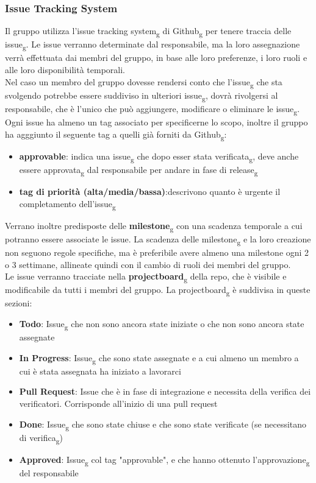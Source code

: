 \subsubsection{Issue Tracking System}
Il gruppo utilizza l'issue tracking system\textsubscript{g} di Github\textsubscript{g} per tenere traccia delle issue\textsubscript{g}. 
Le issue verranno determinate dal responsabile, ma la loro assegnazione verrà effettuata dai membri del gruppo, in base alle loro preferenze, i loro ruoli e alle loro disponibilità temporali.\\
Nel caso un membro del gruppo dovesse rendersi conto che l'issue\textsubscript{g} che sta svolgendo potrebbe essere suddiviso in ulteriori issue\textsubscript{g}, dovrà rivolgersi al responsabile, che è l'unico che può aggiungere, modificare o eliminare le issue\textsubscript{g}.\\
Ogni issue ha almeno un tag associato per specificerne lo scopo, inoltre il gruppo ha agggiunto il seguente tag a quelli già forniti da Github\textsubscript{g}:
\begin{itemize}
	\item \textbf{approvable}: indica una issue\textsubscript{g} che dopo esser stata verificata\textsubscript{g}, deve anche essere approvata\textsubscript{g} dal responsabile per andare in fase di release\textsubscript{g}
	\item \textbf{tag di priorità (alta/media/bassa)}:descrivono quanto è urgente il completamento dell'issue\textsubscript{g} 
\end{itemize}
Verrano inoltre predisposte delle \textbf{milestone}\textsubscript{g} con una scadenza temporale a cui potranno essere associate le issue. 
La scadenza delle milestone\textsubscript{g} e la loro creazione non seguono regole specifiche, ma è preferibile avere almeno una milestone ogni 2 o 3 settimane, allineate quindi con il cambio di ruoli dei membri del gruppo.\\
Le issue verranno tracciate nella \textbf{projectboard}\textsubscript{g} della repo, che è visibile e modificabile da tutti i membri del gruppo.
La projectboard\textsubscript{g} è suddivisa in queste sezioni:
\begin{itemize}
	\item \textbf{Todo}: Issue\textsubscript{g} che non sono ancora state iniziate o che non sono ancora state assegnate
	\item \textbf{In Progress}: Issue\textsubscript{g} che sono state assegnate e a cui almeno un membro a cui è stata assegnata ha iniziato a lavorarci
	\item \textbf{Pull Request}: Issue che è in fase di integrazione e necessita della verifica dei verificatori. Corrisponde all'inizio di una pull request
	\item \textbf{Done}: Issue\textsubscript{g} che sono state chiuse e che sono state verificate (se necessitano di verifica\textsubscript{g})
	\item \textbf{Approved}: Issue\textsubscript{g} col tag "approvable", e che hanno ottenuto l'approvazione\textsubscript{g} del responsabile
\end{itemize}
